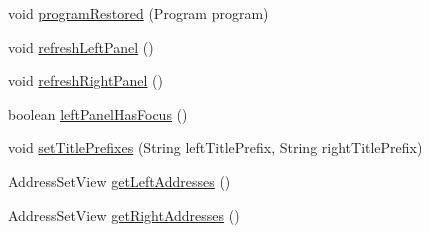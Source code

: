 \begin{DoxyCompactItemize}
\item 
void \mbox{\hyperlink{classghidra_1_1app_1_1decompiler_1_1component_1_1_decompiler_code_comparison_panel_a0744d650c2f9a7496912c02b818251b7}{program\+Restored}} (Program program)
\item 
void \mbox{\hyperlink{classghidra_1_1app_1_1decompiler_1_1component_1_1_decompiler_code_comparison_panel_a3518b9df13555c5e6d32993f17a65a37}{refresh\+Left\+Panel}} ()
\item 
void \mbox{\hyperlink{classghidra_1_1app_1_1decompiler_1_1component_1_1_decompiler_code_comparison_panel_a72394cb529eca4eb319b00695288cec9}{refresh\+Right\+Panel}} ()
\item 
boolean \mbox{\hyperlink{classghidra_1_1app_1_1decompiler_1_1component_1_1_decompiler_code_comparison_panel_a8688fb2bb3497f83899ceaa5858b0769}{left\+Panel\+Has\+Focus}} ()
\item 
void \mbox{\hyperlink{classghidra_1_1app_1_1decompiler_1_1component_1_1_decompiler_code_comparison_panel_aad06fc89c2bc736c8e06f34a5c164e4b}{set\+Title\+Prefixes}} (String left\+Title\+Prefix, String right\+Title\+Prefix)
\item 
Address\+Set\+View \mbox{\hyperlink{classghidra_1_1app_1_1decompiler_1_1component_1_1_decompiler_code_comparison_panel_ad2ba92b89dc9c58beeeeb7be5cfd1b4d}{get\+Left\+Addresses}} ()
\item 
Address\+Set\+View \mbox{\hyperlink{classghidra_1_1app_1_1decompiler_1_1component_1_1_decompiler_code_comparison_panel_a3874146586e207d9b538306b65462951}{get\+Right\+Addresses}} ()
\end{DoxyCompactItemize}
